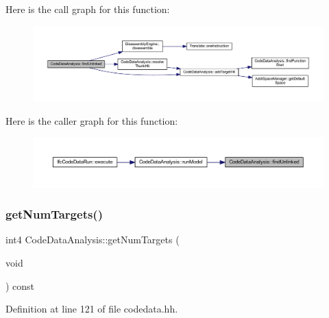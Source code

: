 Here is the call graph for this function\+:
\nopagebreak
\begin{figure}[H]
\begin{center}
\leavevmode
\includegraphics[width=350pt]{class_code_data_analysis_a0e11a53182ac0d58d9fc3d9e8231e61e_cgraph}
\end{center}
\end{figure}
Here is the caller graph for this function\+:
\nopagebreak
\begin{figure}[H]
\begin{center}
\leavevmode
\includegraphics[width=350pt]{class_code_data_analysis_a0e11a53182ac0d58d9fc3d9e8231e61e_icgraph}
\end{center}
\end{figure}
\mbox{\label{class_code_data_analysis_a1f9e8eeaba902f353013deeb95ccf20c}} 
\subsubsection{\texorpdfstring{getNumTargets()}{getNumTargets()}}
{\footnotesize\ttfamily int4 Code\+Data\+Analysis\+::get\+Num\+Targets (\begin{DoxyParamCaption}\item[{void}]{ }\end{DoxyParamCaption}) const\hspace{0.3cm}{\ttfamily [inline]}}



Definition at line 121 of file codedata.\+hh.

\mbox{\label{class_code_data_analysis_a22b2269201919435d22089b292976e56}} 

